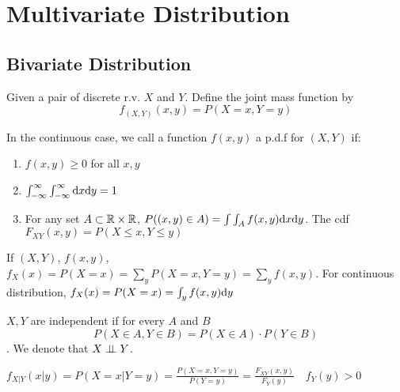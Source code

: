 \chapter{Multivariate Distribution}

\section{Bivariate Distribution}
	\begin{definition}
		Given a pair of discrete r.v. $X$ and $Y$. Define the joint mass function by $$f_{(X,Y)}(x,y) = P(X=x,Y=y)$$
	\end{definition}
	
	\begin{definition}
		In the continuous case, we call a function $f(x,y)$ a p.d.f for $(X,Y)$ if:
		\begin{enumerate}[(1)]
			\item $f(x,y)\geq 0$ for all $x,y$
			\item $\int_{-\infty}^\infty\int_{-\infty}^{\infty}\mathrm{d} x\mathrm{d} y =1$
			\item For any set $A\subset \mathbb{R} \times \mathbb{R} $, $P((x, y)\in A) = \int\int_A f(x, y) \mathrm{d} x\mathrm{d} y$. The cdf $F_{XY}(x,y) = P(X\leq x, Y\leq y)$
		\end{enumerate}
	\end{definition}
	
	\begin{definition}
		If $(X,Y)$, $f(x,y)$, $f_{X}(x) = P(X=x) = \sum\limits_yP(X=x, Y=y)=\sum\limits_y f(x,y)$. For continuous distribution, $f_X(x) = P(X=x)=\int_y f(x,y)\mathrm{d} y$
	\end{definition}
	
	\begin{definition}[Indepedent R.V.]
		$X, Y$ are independent if for every $A$ and $B$
		$$P(X\in A, Y\in B) = P(X\in A)\cdot P(Y\in B)$$.
		We denote that $X \perp \!\!\! \perp Y$.
	\end{definition}

	\begin{definition}
		$f_{X|Y}(x|y)=P(X=x|Y=y) = \frac{P(X=x, Y=y)}{P(Y=y)}=\frac{F_{XY}(x, y)}{F_Y(y)} \quad f_Y(y)>0$
	\end{definition}
	
